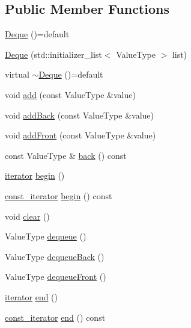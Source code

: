 \subsection*{Public Member Functions}
\begin{DoxyCompactItemize}
\item 
\mbox{\hyperlink{classDeque_a6514d251a0a76b440727037b2a205b3a}{Deque}} ()=default
\item 
\mbox{\hyperlink{classDeque_a68fd6ae6ef9283c882d90c6924e932cd}{Deque}} (std\+::initializer\+\_\+list$<$ Value\+Type $>$ list)
\item 
virtual \mbox{\hyperlink{classDeque_a55937bfda443e26297e41cc1be5b93f0}{$\sim$\+Deque}} ()=default
\item 
void \mbox{\hyperlink{classDeque_ab901606bf3a8019c986f0cf9a9f298dc}{add}} (const Value\+Type \&value)
\item 
void \mbox{\hyperlink{classDeque_a0c733f31bccadf80a6793490b115bd37}{add\+Back}} (const Value\+Type \&value)
\item 
void \mbox{\hyperlink{classDeque_a1d5c5f74583e2a0fcd33f177ecbb9aa4}{add\+Front}} (const Value\+Type \&value)
\item 
const Value\+Type \& \mbox{\hyperlink{classDeque_adc761c91bdacd01bed5c96e25fd9486a}{back}} () const
\item 
\mbox{\hyperlink{classDeque_af87a5290666b1bb4bf3e44cafc305ad5}{iterator}} \mbox{\hyperlink{classDeque_a9401c74ac7945b9ef845456a094e3aa5}{begin}} ()
\item 
\mbox{\hyperlink{classDeque_a82e5b35971ca4096ad8c03687e86f11f}{const\+\_\+iterator}} \mbox{\hyperlink{classDeque_a6d7df88b97979181d0b076ffffa253cc}{begin}} () const
\item 
void \mbox{\hyperlink{classDeque_ac8bb3912a3ce86b15842e79d0b421204}{clear}} ()
\item 
Value\+Type \mbox{\hyperlink{classDeque_aaee07e371e2370e76e6c42bada727ba2}{dequeue}} ()
\item 
Value\+Type \mbox{\hyperlink{classDeque_a0f7233390ba171bc0897e5f9618ac4a6}{dequeue\+Back}} ()
\item 
Value\+Type \mbox{\hyperlink{classDeque_aecf002fe82a60407f6008f6fd7ac2c27}{dequeue\+Front}} ()
\item 
\mbox{\hyperlink{classDeque_af87a5290666b1bb4bf3e44cafc305ad5}{iterator}} \mbox{\hyperlink{classDeque_a3e0273054479ffdb04674903752630a0}{end}} ()
\item 
\mbox{\hyperlink{classDeque_a82e5b35971ca4096ad8c03687e86f11f}{const\+\_\+iterator}} \mbox{\hyperlink{classDeque_a9224b9d5e9b60b47509ac51e8a0fc735}{end}} () const

\end{DoxyCompactItemize}
